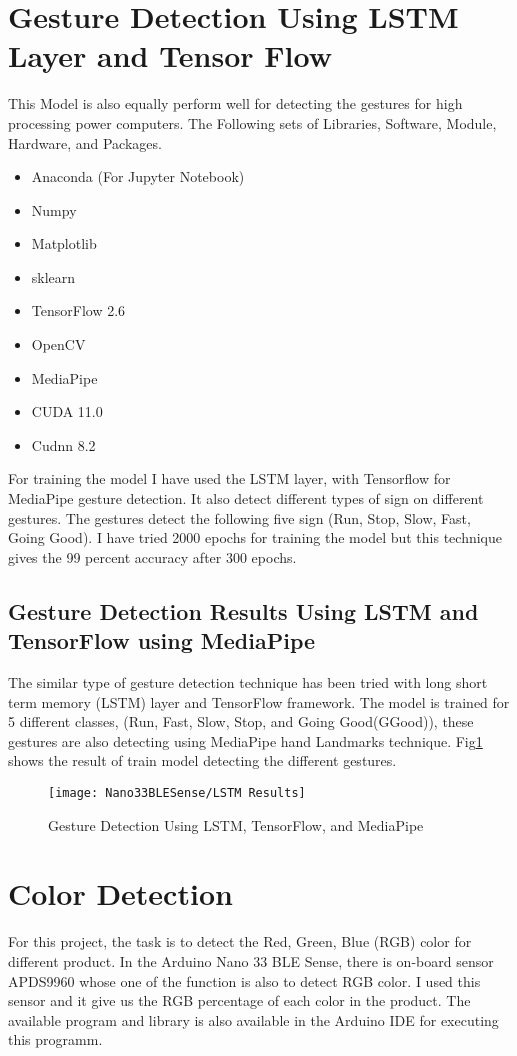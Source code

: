 \section{Gesture Detection Using LSTM Layer and Tensor Flow}
This Model is also equally perform well for detecting the gestures for high processing power computers. The Following sets of Libraries, Software, Module, Hardware, and Packages.
\begin{itemize}
	\item Anaconda (For Jupyter Notebook)
	\item Numpy
	\item Matplotlib
	\item sklearn
	\item TensorFlow 2.6
	\item OpenCV
	\item MediaPipe
	\item CUDA 11.0 
	\item Cudnn 8.2
\end{itemize}
For training the model  I have used the LSTM layer, with Tensorflow for MediaPipe gesture detection. It also detect different types of sign on different gestures. The gestures detect the following five sign (Run, Stop, Slow, Fast, Going Good). I have tried 2000 epochs for training the model but this technique gives the 99 percent accuracy after 300 epochs.
\subsection{Gesture Detection Results Using LSTM and TensorFlow using MediaPipe}
The similar type of gesture detection technique has been tried with long short term memory (LSTM) layer and TensorFlow framework. The model is trained for 5 different classes, (Run, Fast, Slow, Stop, and Going Good(GGood)), these gestures are also detecting using MediaPipe hand Landmarks technique. Fig\ref{Gesture Detection Using LSTM, TensorFlow, and MediaPipe} shows the result of train model detecting the different gestures.
\begin{figure}[h]
	\centering
	\texttt{[image: Nano33BLESense/LSTM Results]}
	\caption{Gesture Detection Using LSTM, TensorFlow, and MediaPipe}
	\label{Gesture Detection Using LSTM, TensorFlow, and MediaPipe}
\end{figure}
\section{Color Detection}
For this project, the task is to detect the Red, Green, Blue (RGB) color for different product. In the Arduino Nano 33 BLE Sense, there is on-board sensor APDS9960 whose one of the function is also to detect RGB color. I used this sensor and it give us the RGB percentage of each color in the product. The available program and library is also available in the Arduino IDE for executing this programm.
